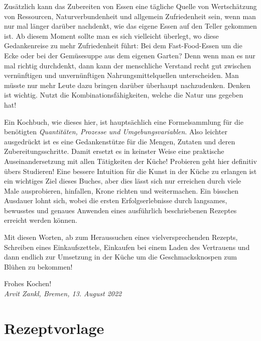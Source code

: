 \documentclass[a4paper, 12pt]{scrbook} 								%
\numberwithin{equation}{section} 									%
\begin{document}
	Zusätzlich kann das Zubereiten von Essen eine tägliche Quelle von Wertschätzung von Ressourcen, Naturverbundenheit und allgemein Zufriedenheit sein, wenn man nur mal länger darüber nachdenkt, wie das eigene Essen auf den Teller gekommen ist. Ab diesem Moment sollte man es sich vielleicht überlegt, wo diese Gedankenreise zu mehr Zufriedenheit führt: Bei dem Fast-Food-Essen um die Ecke oder bei der Gemüsesuppe aus dem eigenen Garten? Denn wenn man es nur mal richtig durchdenkt, dann kann der menschliche Verstand recht gut zwischen vernünftigen und unvernünftigen Nahrungsmittelquellen unterscheiden. Man müsste nur mehr Leute dazu bringen darüber überhaupt nachzudenken. Denken ist wichtig. Nutzt die Kombinationsfähigkeiten, welche die Natur uns gegeben hat!

	Ein Kochbuch, wie dieses hier, ist hauptsächlich eine Formelsammlung für die benötigten \emph{Quantitäten, Prozesse und Umgebungsvariablen}. Also leichter ausgedrückt ist es eine Gedankenstütze für die Mengen, Zutaten und deren Zubereitungsschritte. Damit ersetzt es in keinster Weise eine praktische Auseinandersetzung mit allen Tätigkeiten der Küche! Probieren geht hier definitiv übers Studieren! Eine bessere Intuition für die Kunst in der Küche zu erlangen ist ein wichtiges Ziel dieses Buches, aber dies lässt sich nur erreichen durch viele Male ausprobieren, hinfallen, Krone richten und weitermachen. Ein bisschen Ausdauer lohnt sich, wobei die ersten Erfolgserlebnisse durch langsames, bewusstes und genaues Anwenden eines ausführlich beschriebenen Rezeptes erreicht werden können.

	Mit diesen Worten, ab zum Heraussuchen eines vielversprechenden Rezepts, Schreiben eines Einkaufszettels, Einkaufen bei einem Laden des Vertrauens und dann endlich zur Umsetzung in der Küche um die Geschmacksknospen zum Blühen zu bekommen!
	
	Frohes Kochen! \\
	\textit{Arvit Zankl, Bremen, 13. August 2022} 
	\newpage



\section{Rezeptvorlage}	\label{Rezeptlabel}
\end{document}
